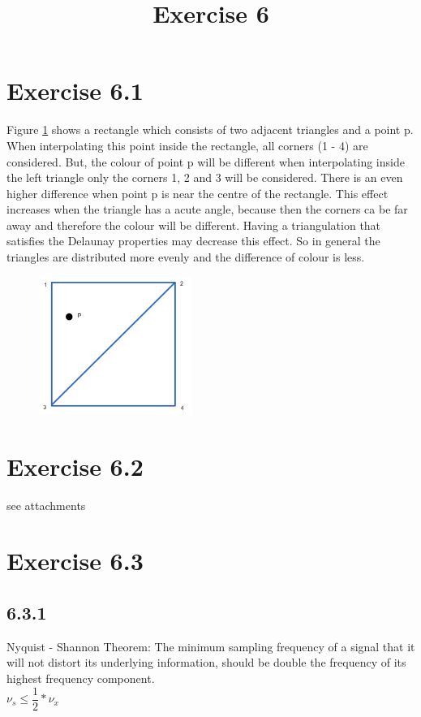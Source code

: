 \documentclass[a4paper]{article}
\date{}
\author{}
\title{Exercise 6}
\begin{document}
\maketitle 
\thispagestyle{fancy}


\section*{Exercise 6.1}

Figure \ref{fig:triangle} shows a rectangle which consists of two adjacent triangles and a point p. 
When interpolating this point inside the rectangle, all corners (1 - 4) are considered. 
But, the colour of point p will be different when interpolating inside the left triangle only the corners 1, 2 and 3 will be considered. 
There is an even higher difference when point p is near the centre of the rectangle. 
This effect increases when the triangle has a acute angle, because then the corners ca be far away and therefore the colour will be different. 
Having a triangulation that satisfies the Delaunay properties may decrease this effect. 
So in general the triangles are distributed more evenly and the difference of colour is less. 

\begin{figure}[h!]
	\centering 
	\includegraphics[width=5cm]{A1.png}
	\caption{}
	\label{fig:triangle}
\end{figure}

\section*{Exercise 6.2}
see attachments

\section*{Exercise 6.3}

\subsection*{6.3.1}
Nyquist - Shannon Theorem:
The minimum sampling frequency of a signal that it will not distort its underlying information, should be double the frequency of its highest frequency component.\\
$ \nu_s \leq \dfrac{1}{2} * \nu_x $
\end{document}
